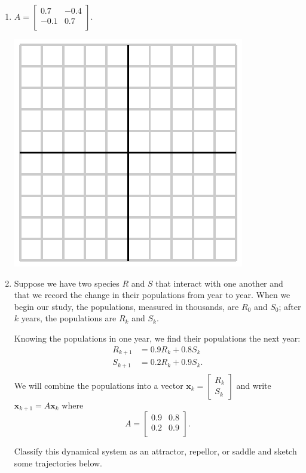 \documentclass[12pt]{article}
\newcommand{\xvec}{{\mathbf x}}
\newcommand{\twovec}[2]{\left[\begin{array}{r}#1 \\ #2
    \end{array}\right]}
\begin{document}
\begin{enumerate}
\item
  $A =
  \left[
    \begin{array}{cc}
      0.7 & -0.4 \\
      -0.1 & 0.7 \\
    \end{array}
  \right].
  $

  \includegraphics{empty.eps}

\item Suppose we have two species $R$ and $S$ that interact with one
  another and that we record the change in their populations from year
  to year. When we begin our study, the populations, measured in
  thousands, are $R_0$ and $S_0$; after $k$ years, the populations are
  $R_k$ and $S_k$.

  Knowing the populations in one year, we find their populations the
  next year:
  $$
  \begin{aligned}
    R_{k+1}&= 0.9R_k + 0.8S_k \\
    S_{k+1}&= 0.2R_k + 0.9S_k. \\
  \end{aligned}
  $$
  We will combine the populations into a vector
  $\xvec_k=\twovec{R_k}{S_k}$ and write
  $\xvec_{k+1}=A\xvec_k$ where
  $$
  A =
  \left[
    \begin{array}{cc}
      0.9 & 0.8 \\
      0.2 & 0.9 \\
    \end{array}
  \right].
  $$

  Classify this dynamical system as an attractor, repellor, or
  saddle and sketch some trajectories below.


\end{enumerate}
\end{document}
